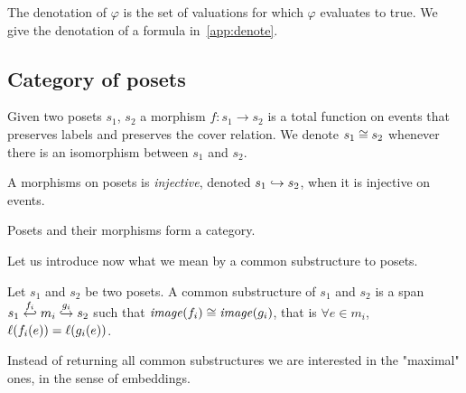 The denotation of $\varphi$ is the set of valuations for which $\varphi$ evaluates to true. We give the denotation of a formula in~\autoref{app:denote}.

\subsection{Category of posets}
\label{sec:posets}

\begin{definition}
  Given two posets $s_1$, $s_2$ a morphism $f:s_1\to s_2$ is a total function on events that preserves labels and preserves the cover relation. We denote $s_1\cong s_2$ whenever there is an isomorphism between $s_1$ and $s_2$.

  A morphisms on posets is \emph{injective}, denoted $s_1\hookrightarrow s_2$, when it is injective on events.
\end{definition}

\begin{lemma}
  Posets and their morphisms form a category.
\end{lemma}

Let us introduce now what we mean by a common substructure to posets.

\begin{definition}
  Let $s_1$ and $s_2$ be two posets.
  A common substructure of $s_1$ and $s_2$ is a span $s_1\overset{f_i}{\hookleftarrow} m_i\overset{g_i}{\hookrightarrow} s_2$ such that $\mathit{image}(f_i) \cong \mathit{image}(g_i)$, that is $\forall e\in m_i$, $\ell(f_i(e)) = \ell(g_i(e))$.
\end{definition}

Instead of returning all common substructures we are interested in the "maximal" ones, in the sense of embeddings.

